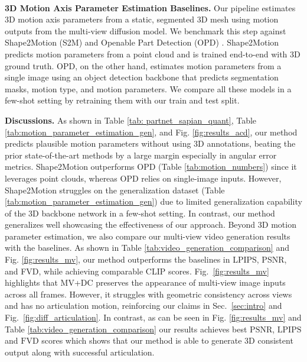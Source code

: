 \\
\noindent\textbf{3D Motion Axis Parameter Estimation Baselines.} Our pipeline estimates 3D motion axis parameters from a static, segmented 3D mesh using motion outputs from the multi-view diffusion model. We benchmark this step against Shape2Motion (S2M) \cite{wang2019shape2motion} and Openable Part Detection (OPD) \cite{jiang2022opd}. Shape2Motion predicts motion parameters from a point cloud and is trained end-to-end with 3D ground truth. OPD, on the other hand, estimates motion parameters from a single image using an object detection backbone that predicts segmentation masks, motion type, and motion parameters. We compare all these models in a few-shot setting by retraining them with our train and test split.






\noindent \textbf{Discussions.} As shown in Table \ref{tab: partnet_sapian_quant}, Table \ref{tab:motion_parameter_estimation_gen}, and Fig. \ref{fig:results_acd}, our method predicts plausible motion parameters without using 3D annotations, beating the prior state-of-the-art methods by a large margin especially in angular error metrics. Shape2Motion outperforms OPD (Table \ref{tab:motion_numbers}) since it leverages point clouds, whereas OPD relies on single-image inputs. However, Shape2Motion struggles on the generalization dataset (Table \ref{tab:motion_parameter_estimation_gen}) due to limited generalization capability of the 3D backbone network in a few-shot setting. In contrast, our method generalizes well showcasing the effectiveness of our approach.
Beyond 3D motion parameter estimation, we also compare our multi-view video generation results with the baselines. As shown in Table \ref{tab:video_generation_comparison} and Fig. \ref{fig:results_mv}, our method outperforms the baselines in LPIPS, PSNR, and FVD, while achieving comparable CLIP scores. Fig.~\ref{fig:results_mv} highlights that MV+DC preserves the appearance of multi-view image inputs across all frames. However, it struggles with geometric consistency across views and has no articulation motion, reinforcing our claims in Sec.~\ref{sec:intro} and Fig.~\ref{fig:diff_articulation}. In contrast, as can be seen in Fig. \ref{fig:results_mv} and Table \ref{tab:video_generation_comparison} our results achieves best $\text{PSNR}$, $\text{LPIPS}$ and $\text{FVD}$ scores which shows that our method is able to generate 3D consistent output along with successful articulation. 
